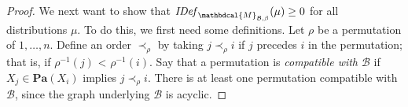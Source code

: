 \documentclass[letterpaper]{article} %
\theoremstyle{plain}
\theoremstyle{definition}
\theoremstyle{remark}
\newcommand{\dg}[1]{\mathbdcal{#1}}
\newcommand\Pa{\mathbf{Pa}}
\newcommand{\IDef}[1]{\mathit{IDef}_{#1}}
\newcommand{\PDGof}[1]{{\dg M}_{#1}}
\begin{document}
\begin{proof}
We next want to show  that $\IDef{\PDGof{\mathcal B,\beta}}(\mu) \ge 0$ for all
distributions $\mu$.  To do this, we first need some definitions.
Let $\rho$ be a permutation of $1, \ldots,  n$.  Define an order
$\prec_{\rho}$ by taking $j \prec_{\rho} i$ if $j$ precedes $i$ in the
permutation; that is, if 
$\rho^{-1}(j)$ < $\rho^{-1}(i)$. Say that a permutation is \emph{compatible with
  $\mathcal B$} if $X_j \in \Pa(X_i)$ implies $j \prec_{\rho} i$.   There
is at least one permutation compatible with $\mathcal B$, since 
the graph underlying $\mathcal B$ is acyclic.
  

\end{proof}
\end{document}
